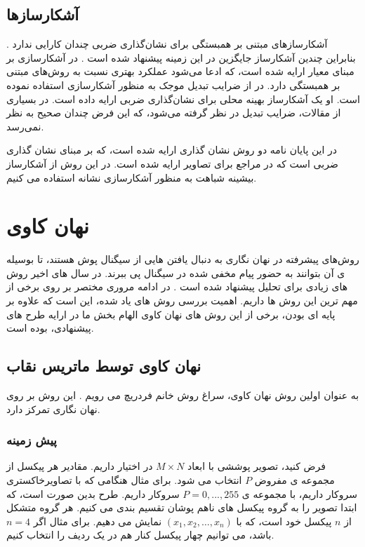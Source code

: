 \subsection{آشکارسازها}
آشکارسازهای مبتنی بر همبستگی برای نشان‌گذاری ضربی چندان کارایی ندارد \cite{Cox2002}. بنابراین چندین آشکارساز جایگزین در این زمینه پیشنهاد شده است {\cite{Barni2001,Wang2008,Solachidis2004,Ng2006}}. در {\cite{Barni2001}} آشکارسازی بر مبنای معیار {} ارایه شده است، که ادعا می‌شود عملکرد بهتری نسبت به روش‌های مبتنی بر همبستگی دارد. {} در {\cite{Wang2008}}  از ضرایب تبدیل موجک به منظور آشکارسازی استفاده نموده است. او یک آشکارساز بهینه محلی برای نشان‌گذاری ضربی {} ارایه داده است. در بسیاری از مقالات، ضرایب تبدیل {} در نظر گرفته می‌شود، که این فرض چندان صحیح به نظر نمی‌رسد. 

در این پایان نامه دو روش نشان گذاری ارایه شده  است، که بر مبنای نشان گذاری ضربی است که در مراجع {\cite{Akhaee2009a,Akhaee2010,Akhaee2009c}} برای تصاویر ارایه شده است. در این روش از آشکارساز بیشینه شباهت به منظور آشکارسازی نشانه استفاده می کنیم. 





\section{نهان کاوی}
روش‌های پیشرفته در نهان نگاری به دنبال یافتن {}هایی از سیگنال پوش هستند، تا بوسیله ی آن بتوانند به حضور پیام مخفی شده در سیگنال پی ببرند.  در سال های اخیر روش های زیادی برای تحلیل  پیشنهاد شده است 
\cite{Harmsen2003_Steganalysis,Fridrich2001_Detecting,Dumitrescu2002_steganalysis,Agaian2010,
Chiew2010,Goyal2010,He2010,Kashyap2010}.
در ادامه مروری مختصر بر روی برخی از مهم ترین این روش ها داریم. اهمیت بررسی روش های یاد شده، این است که علاوه بر پایه ای بودن، برخی از این روش های نهان کاوی الهام بخش ما در ارایه طرح های پیشنهادی، بوده است. 

\subsection{نهان کاوی توسط ماتریس نقاب}
به عنوان اولین روش نهان کاوی، سراغ روش خانم فردریچ{} می رویم \cite{Fridrich2001_Detecting}. این روش بر روی نهان نگاری {} تمرکز دارد.
\subsubsection{پیش زمینه}
فرض کنید، تصویر پوششی با ابعاد {$ M\times N $} در اختیار داریم. مقادیر هر پیکسل از مجموعه ی مفروض $ P $ انتخاب می شود. برای مثال هنگامی که با تصاویرخاکستری  سروکار داریم، با مجموعه ی  $ P={0,...,255} $    سروکار داریم. طرح  {} بدین صورت است، که ابتدا تصویر را به گروه پیکسل های ناهم پوشان تقسیم بندی می کنیم. هر گروه متشکل از $ n $ پیکسل {} خود است، که با $ (x_{1},x_{2},\ldots ,x_{n}) $ نمایش می دهیم. برای مثال اگر $ n=4 $ باشد، می توانیم چهار پیکسل کنار هم در یک ردیف را انتخاب کنیم. 

